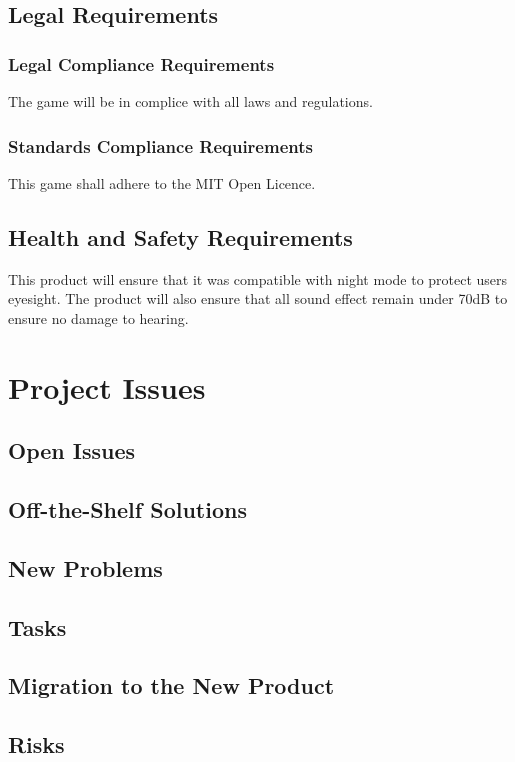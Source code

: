 \documentclass[12pt, titlepage]{article}
\begin{document}
\subsection{Legal Requirements}
\subsubsection{Legal Compliance Requirements}
The game will be in complice with all laws and regulations.
\subsubsection{Standards Compliance Requirements}
This game shall adhere to the MIT Open Licence.

\subsection{Health and Safety Requirements}
This product will ensure that it was compatible with night mode to protect users eyesight. The product will also ensure that all sound effect remain under 70dB to ensure no damage to hearing. 

\section{Project Issues}

\subsection{Open Issues}

\subsection{Off-the-Shelf Solutions}

\subsection{New Problems}

\subsection{Tasks}

\subsection{Migration to the New Product}

\subsection{Risks}
\end{document}
